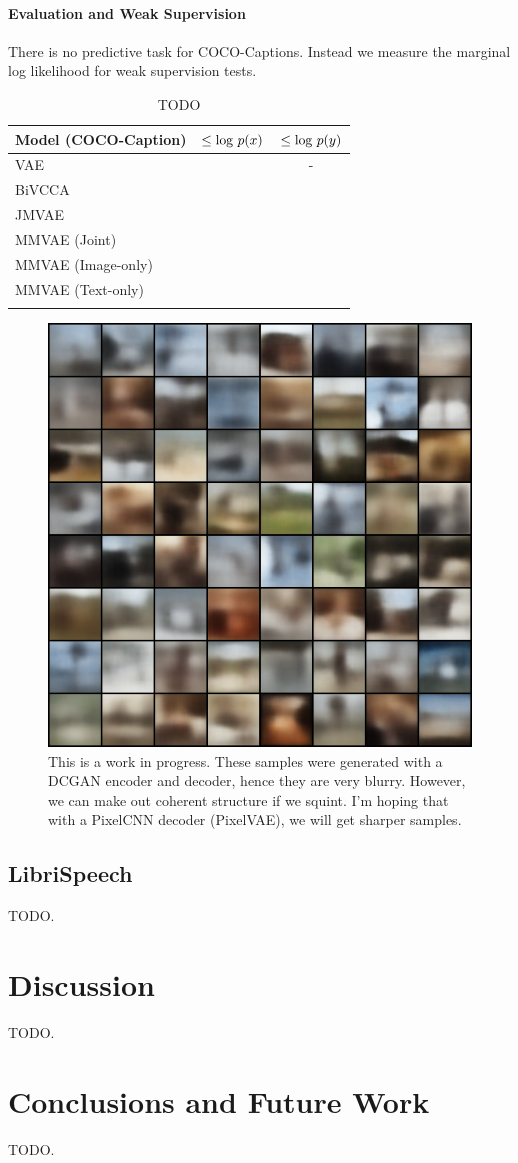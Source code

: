 \documentclass{article}
\begin{document}
\paragraph{Evaluation and Weak Supervision} There is no predictive task for COCO-Captions. Instead we measure the marginal log likelihood for weak supervision tests. 

\begin{table}[!h]
    \centering
    \begin{tabular}{ l | c | c }
        Model (COCO-Caption) & $\leq \textup{log }p(x)$ & $\leq \textup{log }p(y)$ \\
        \hline
        VAE & & - \\
        BiVCCA & &  \\
        JMVAE & & \\
        MMVAE (Joint) & & \\
        MMVAE (Image-only) & & \\
        MMVAE (Text-only) & & \\
        \newline
    \end{tabular}
    \caption{TODO}
    \label{table:mnist:marginal}
\end{table}

\begin{figure}[!h]
    \centering
    \includegraphics[width=.5\linewidth]{coco_mmvae_image_sample.png}
    \caption{This is a work in progress. These samples were generated with a DCGAN encoder and decoder, hence they are very blurry. However, we can make out coherent structure if we squint. I'm hoping that with a PixelCNN decoder (PixelVAE), we will get sharper samples.}
    \label{fig:WIP:coco:samples}
\end{figure}

\subsection{LibriSpeech}
TODO.

\section{Discussion}
TODO.

\section{Conclusions and Future Work}
TODO.


{\small
\linespread{1}

}
\end{document}
